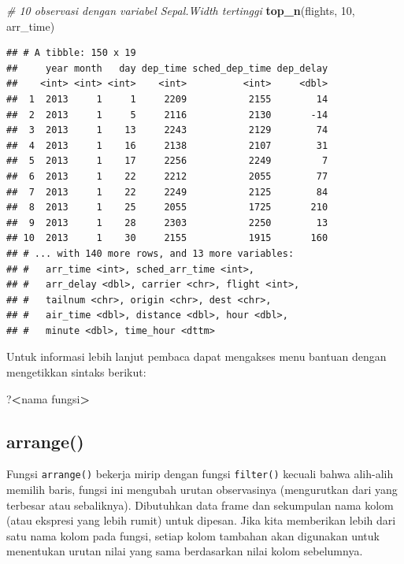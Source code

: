 \documentclass[]{book}
\newenvironment{Shaded}{\begin{snugshade}}{\end{snugshade}}
\newcommand{\KeywordTok}[1]{\textcolor[rgb]{0.13,0.29,0.53}{\textbf{#1}}}
\newcommand{\DecValTok}[1]{\textcolor[rgb]{0.00,0.00,0.81}{#1}}
\newcommand{\CommentTok}[1]{\textcolor[rgb]{0.56,0.35,0.01}{\textit{#1}}}
\newcommand{\OperatorTok}[1]{\textcolor[rgb]{0.81,0.36,0.00}{\textbf{#1}}}
\newcommand{\NormalTok}[1]{#1}
\begin{document}
\begin{Shaded}
\begin{Highlighting}[]
\CommentTok{# 10 observasi dengan variabel Sepal.Width tertinggi}
\KeywordTok{top_n}\NormalTok{(flights, }\DecValTok{10}\NormalTok{, arr_time)}
\end{Highlighting}
\end{Shaded}

\begin{verbatim}
## # A tibble: 150 x 19
##     year month   day dep_time sched_dep_time dep_delay
##    <int> <int> <int>    <int>          <int>     <dbl>
##  1  2013     1     1     2209           2155        14
##  2  2013     1     5     2116           2130       -14
##  3  2013     1    13     2243           2129        74
##  4  2013     1    16     2138           2107        31
##  5  2013     1    17     2256           2249         7
##  6  2013     1    22     2212           2055        77
##  7  2013     1    22     2249           2125        84
##  8  2013     1    25     2055           1725       210
##  9  2013     1    28     2303           2250        13
## 10  2013     1    30     2155           1915       160
## # ... with 140 more rows, and 13 more variables:
## #   arr_time <int>, sched_arr_time <int>,
## #   arr_delay <dbl>, carrier <chr>, flight <int>,
## #   tailnum <chr>, origin <chr>, dest <chr>,
## #   air_time <dbl>, distance <dbl>, hour <dbl>,
## #   minute <dbl>, time_hour <dttm>
\end{verbatim}

Untuk informasi lebih lanjut pembaca dapat mengakses menu bantuan dengan
mengetikkan sintaks berikut:

\begin{Shaded}
\begin{Highlighting}[]
\NormalTok{?}\OperatorTok{<}\NormalTok{nama fungsi}\OperatorTok{>}
\end{Highlighting}
\end{Shaded}

\subsection{arrange()}\label{arrange}

Fungsi \texttt{arrange()} bekerja mirip dengan fungsi \texttt{filter()}
kecuali bahwa alih-alih memilih baris, fungsi ini mengubah urutan
observasinya (mengurutkan dari yang terbesar atau sebaliknya).
Dibutuhkan data frame dan sekumpulan nama kolom (atau ekspresi yang
lebih rumit) untuk dipesan. Jika kita memberikan lebih dari satu nama
kolom pada fungsi, setiap kolom tambahan akan digunakan untuk menentukan
urutan nilai yang sama berdasarkan nilai kolom sebelumnya.
\end{document}
